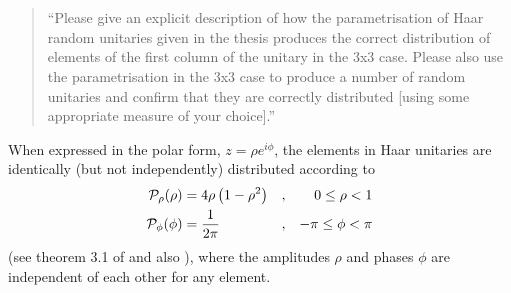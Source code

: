 \documentclass[a4paper,11pt]{article}
\begin{document}
\section{}
\begin{quote}
  ``Please give an explicit description of how the parametrisation of
  Haar random unitaries given in the thesis produces the correct
  distribution of elements of the first column of the unitary in the 3x3
  case.  Please also use the parametrisation in the 3x3 case to produce
  a number of random unitaries and confirm that they are correctly
  distributed [using some appropriate measure of your choice].''
\end{quote}
When expressed in the polar form, \(z=\rho e^{i\phi}\), the elements in Haar
unitaries are identically (but not independently) distributed according to
\begin{align}
  \label{eq:rho}
  \mathcal{P}_{\rho} \!\left(\rho\right) &= 4\rho\left(1-\rho^{2}\right) &,
    && 0 \leq \rho < 1 \\
  \label{eq:phi}
  \mathcal{P}_{\phi} \!\left(\phi\right) &= \frac{1}{2\pi} &, && -\pi \leq \phi < \pi
\end{align}
(see theorem 3.1 of \cite{reffy} and also \cite{haar-entries}),
where the amplitudes \(\rho\) and phases \(\phi\) are independent of each other
for any element.
\end{document}

